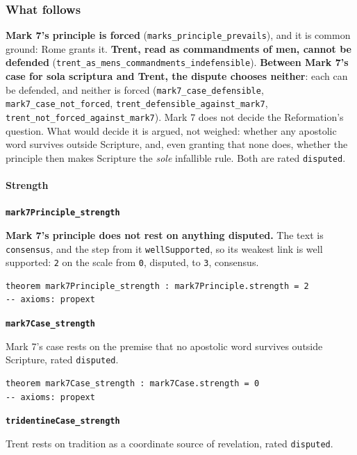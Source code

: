 \documentclass[11pt]{article}
\begin{document}
\subsubsection*{What follows}
\textbf{Mark 7's principle is forced} (\texttt{marks\_\allowbreak{}principle\_\allowbreak{}prevails}), and it is common ground: Rome grants it. \textbf{Trent, read as commandments of men, cannot be defended} (\texttt{trent\_\allowbreak{}as\_\allowbreak{}mens\_\allowbreak{}commandments\_\allowbreak{}indefensible}). \textbf{Between Mark 7's case for sola scriptura and Trent, the dispute chooses neither}: each can be defended, and neither is forced (\texttt{mark7\_\allowbreak{}case\_\allowbreak{}defensible}, \texttt{mark7\_\allowbreak{}case\_\allowbreak{}not\_\allowbreak{}forced}, \texttt{trent\_\allowbreak{}defensible\_\allowbreak{}against\_\allowbreak{}mark7}, \texttt{trent\_\allowbreak{}not\_\allowbreak{}forced\_\allowbreak{}against\_\allowbreak{}mark7}). Mark 7 does not decide the Reformation's question. What would decide it is argued, not weighed: whether any apostolic word survives outside Scripture, and, even granting that none does, whether the principle then makes Scripture the \emph{sole} infallible rule. Both are rated \texttt{disputed}.

\paragraph*{Strength}
\leavevmode\par
\par\medskip\noindent\textbf{\texttt{mark7\allowbreak{}Principle\_\allowbreak{}strength}}\par\nobreak\noindent
\textbf{Mark 7's principle does not rest on anything disputed.} The text is \texttt{consensus}, and the step from it \texttt{well\allowbreak{}Supported}, so its weakest link is well supported: \texttt{2} on the scale from \texttt{0}, disputed, to \texttt{3}, consensus.

{\small\begin{verbatim}
theorem mark7Principle_strength : mark7Principle.strength = 2
-- axioms: propext
\end{verbatim}}
\par\medskip\noindent\textbf{\texttt{mark7\allowbreak{}Case\_\allowbreak{}strength}}\par\nobreak\noindent
Mark 7's case rests on the premise that no apostolic word survives outside Scripture, rated \texttt{disputed}.

{\small\begin{verbatim}
theorem mark7Case_strength : mark7Case.strength = 0
-- axioms: propext
\end{verbatim}}
\par\medskip\noindent\textbf{\texttt{tridentine\allowbreak{}Case\_\allowbreak{}strength}}\par\nobreak\noindent
Trent rests on tradition as a coordinate source of revelation, rated \texttt{disputed}.
\end{document}
